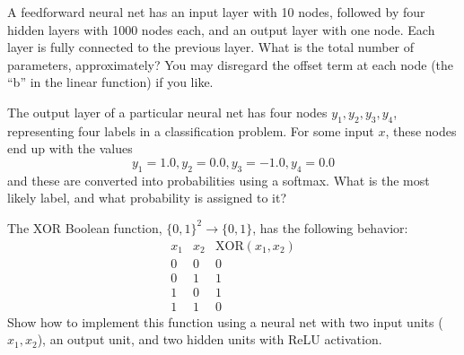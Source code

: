 \documentclass{article}
\begin{document}
\begin{probset}
\begin{prob}
    A feedforward neural net has an input layer with 10 nodes, followed by four hidden layers with 1000 nodes each, and an output layer with one node. Each layer is fully connected to the previous layer. What is the total number of parameters, approximately? You may disregard the offset term at each node (the ``b'' in the linear function) if you like.

    \begin{soln}
        
    \end{soln}
\end{prob}

\begin{prob}
    The output layer of a particular neural net has four nodes $y_1, y_2, y_3, y_4$, representing four labels in a classification problem. For some input $x$, these nodes end up with the values
    \[
        y_1 = 1.0, y_2 = 0.0, y_3 = -1.0, y_4 = 0.0
    \]
    and these are converted into probabilities using a softmax. What is the most likely label, and what probability is assigned to it?

    \begin{soln}

    \end{soln}
\end{prob}

\begin{prob}
    The XOR Boolean function, $\{0, 1\}^2 \rightarrow \{0, 1\}$, has the following behavior:
    \[
        \begin{array}{c|c|c}
            x_1 & x_2 & \text{XOR}(x_1, x_2) \\
            \hline
            0 & 0 & 0 \\
            0 & 1 & 1 \\
            1 & 0 & 1 \\
            1 & 1 & 0
        \end{array}
    \]
    Show how to implement this function using a neural net with two input units ($x_1, x_2$), an output unit, and two hidden units with ReLU activation.

    \begin{soln}

    \end{soln}
\end{prob}


\end{probset}
\end{document}
